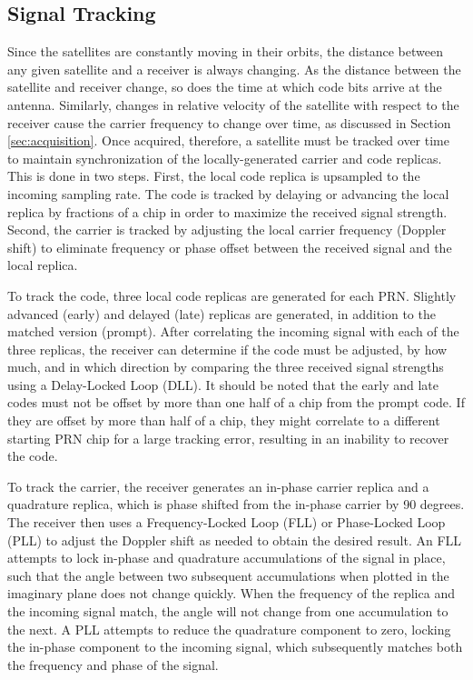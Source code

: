\documentclass[12pt]{article}
\begin{document}
\subsection{Signal Tracking}
\label{sec:tracking}
Since the satellites are constantly moving in their orbits, the distance between any given satellite and a receiver is always changing. As the distance between the satellite and receiver change, so does the time at which code bits arrive at the antenna. Similarly, changes in relative velocity of the satellite with respect to the receiver cause the carrier frequency to change over time, as discussed in Section \ref{sec:acquisition}. Once acquired, therefore, a satellite must be tracked over time to maintain synchronization of the locally-generated carrier and code replicas. This is done in two steps. First, the local code replica is upsampled to the incoming sampling rate. The code is tracked by delaying or advancing the local replica by fractions of a chip in order to maximize the received signal strength. Second, the carrier is tracked by adjusting the local carrier frequency (Doppler shift) to eliminate frequency or phase offset between the received signal and the local replica.

To track the code, three local code replicas are generated for each PRN. Slightly advanced (early) and delayed (late) replicas are generated, in addition to the matched version (prompt). After correlating the incoming signal with each of the three replicas, the receiver can determine if the code must be adjusted, by how much, and in which direction by comparing the three received signal strengths using a Delay-Locked Loop (DLL). It should be noted that the early and late codes must not be offset by more than one half of a chip from the prompt code. If they are offset by more than half of a chip, they might correlate to a different starting PRN chip for a large tracking error, resulting in an inability to recover the code.

To track the carrier, the receiver generates an in-phase carrier replica and a quadrature replica, which is phase shifted from the in-phase carrier by 90 degrees. The receiver then uses a Frequency-Locked Loop (FLL) or Phase-Locked Loop (PLL) to adjust the Doppler shift as needed to obtain the desired result. An FLL attempts to lock in-phase and quadrature accumulations of the signal in place, such that the angle between two subsequent accumulations when plotted in the imaginary plane does not change quickly. When the frequency of the replica and the incoming signal match, the angle will not change from one accumulation to the next. A PLL attempts to reduce the quadrature component to zero, locking the in-phase component to the incoming signal, which subsequently matches both the frequency and phase of the signal.
\end{document}
